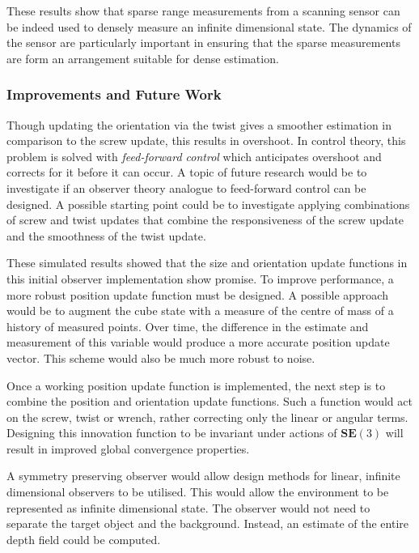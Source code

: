 These results show that sparse range measurements from a scanning sensor can be indeed used to densely measure an infinite dimensional state. The dynamics of the sensor are particularly important in ensuring that the sparse measurements are form an arrangement suitable for dense estimation.

\subsubsection{Improvements and Future Work}
Though updating the orientation via the twist gives a smoother estimation in comparison to the screw update, this results in overshoot. In control theory, this problem is solved with \textit{feed-forward control} which anticipates overshoot and corrects for it before it can occur. A topic of future research would be to investigate if an observer theory analogue to feed-forward control can be designed. A possible starting point could be to investigate applying combinations of screw and twist updates that combine the responsiveness of the screw update and the smoothness of the twist update. 

These simulated results showed that the size and orientation update functions in this initial observer implementation show promise. To improve performance, a more robust position update function must be designed. A possible approach would be to augment the cube state with a measure of the centre of mass of a history of measured points. Over time, the difference in the estimate and measurement of this variable would produce a more accurate position update vector. This scheme would also be much more robust to noise.

Once a working position update function is implemented, the next step is to combine the position and orientation update functions. Such a function would act on the screw, twist or wrench, rather correcting only the linear or angular terms. Designing this innovation function to be invariant under actions of $\mathbf{SE}(3)$ will result in improved global convergence properties.

A symmetry preserving observer would allow design methods for linear, infinite dimensional observers to be utilised. This would allow the environment to be represented as infinite dimensional state. The observer would not need to separate the target object and the background. Instead, an estimate of the entire depth field could be computed.